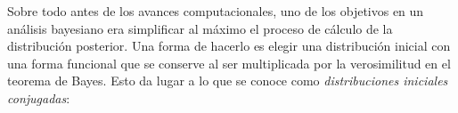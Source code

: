 {Sobre todo antes de los avances computacionales, uno de los objetivos en un análisis bayesiano era simplificar al máximo el proceso de cálculo de la distribución posterior. Una forma de hacerlo es elegir una distribución inicial con una forma funcional que se conserve al ser multiplicada por la verosimilitud en el teorema de Bayes. Esto da lugar a lo que se conoce como \textit{distribuciones iniciales conjugadas}: 

}
